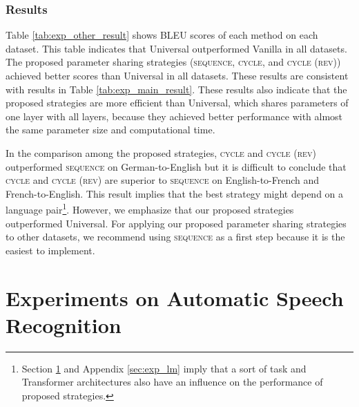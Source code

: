 \documentclass[11pt]{article}
\begin{document}
\subsubsection{Results}
Table \ref{tab:exp_other_result} shows BLEU scores of each method on each dataset.
This table indicates that Universal outperformed Vanilla in all datasets.
The proposed parameter sharing strategies (\textsc{sequence}, \textsc{cycle}, and \textsc{cycle (rev)}) achieved better scores than Universal in all datasets.
These results are consistent with results in Table \ref{tab:exp_main_result}.
These results also indicate that the proposed strategies are more efficient than Universal, which shares parameters of one layer with all layers, because they achieved better performance with almost the same parameter size and computational time.

In the comparison among the proposed strategies, \textsc{cycle} and \textsc{cycle (rev)} outperformed \textsc{sequence} on German-to-English but it is difficult to conclude that \textsc{cycle} and \textsc{cycle (rev)} are superior to \textsc{sequence} on English-to-French and French-to-English.
This result implies that the best strategy might depend on a language pair\footnote{Section \ref{sec:exp_asr} and Appendix \ref{sec:exp_lm} imply that a sort of task and Transformer architectures also have an influence on the performance of proposed strategies.}.
However, we emphasize that our proposed strategies outperformed Universal.
For applying our proposed parameter sharing strategies to other datasets, we recommend using \textsc{sequence} as a first step because it is the easiest to implement.


\section{Experiments on Automatic Speech Recognition}
\label{sec:exp_asr}
\end{document}
